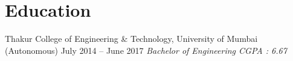 \section{Education}
{Thakur College of Engineering \& Technology, University of Mumbai (Autonomous) \hspace{13mm} July 2014 -- June 2017}
    \hspace{0.05cm} { \textit{Bachelor of Engineering {\hspace{131mm} {CGPA : 6.67}}}}